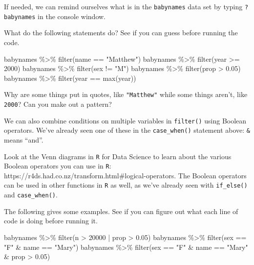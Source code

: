 \documentclass[
]{book}
\newenvironment{Shaded}{\begin{snugshade}}{\end{snugshade}}
\newcommand{\DecValTok}[1]{\textcolor[rgb]{0.00,0.00,0.81}{#1}}
\newcommand{\FloatTok}[1]{\textcolor[rgb]{0.00,0.00,0.81}{#1}}
\newcommand{\FunctionTok}[1]{\textcolor[rgb]{0.00,0.00,0.00}{#1}}
\newcommand{\NormalTok}[1]{#1}
\newcommand{\SpecialCharTok}[1]{\textcolor[rgb]{0.00,0.00,0.00}{#1}}
\newcommand{\StringTok}[1]{\textcolor[rgb]{0.31,0.60,0.02}{#1}}
\begin{document}
If needed, we can remind ourselves what is in the \texttt{babynames} data set by typing \texttt{?babynames} in the console window.

What do the following statements do? See if you can guess before running the code.

\begin{Shaded}
\begin{Highlighting}[]
\NormalTok{babynames }\SpecialCharTok{\%\textgreater{}\%} \FunctionTok{filter}\NormalTok{(name }\SpecialCharTok{==} \StringTok{"Matthew"}\NormalTok{)}
\NormalTok{babynames }\SpecialCharTok{\%\textgreater{}\%} \FunctionTok{filter}\NormalTok{(year }\SpecialCharTok{\textgreater{}=} \DecValTok{2000}\NormalTok{)}
\NormalTok{babynames }\SpecialCharTok{\%\textgreater{}\%} \FunctionTok{filter}\NormalTok{(sex }\SpecialCharTok{!=} \StringTok{"M"}\NormalTok{)}
\NormalTok{babynames }\SpecialCharTok{\%\textgreater{}\%} \FunctionTok{filter}\NormalTok{(prop }\SpecialCharTok{\textgreater{}} \FloatTok{0.05}\NormalTok{)}
\NormalTok{babynames }\SpecialCharTok{\%\textgreater{}\%} \FunctionTok{filter}\NormalTok{(year }\SpecialCharTok{==} \FunctionTok{max}\NormalTok{(year))}
\end{Highlighting}
\end{Shaded}

Why are some things put in quotes, like \texttt{"Matthew"} while some things aren't, like \texttt{2000}? Can you make out a pattern?

We can also combine conditions on multiple variables in \texttt{filter()} using Boolean operators. We've already seen one of these in the \texttt{case\_when()} statement above: \texttt{\&} means ``and''.

Look at the Venn diagrams in \texttt{R} for Data Science to learn about the various Boolean operators you can use in \texttt{R}: https://r4ds.had.co.nz/transform.html\#logical-operators. The Boolean operators can be used in other functions in \texttt{R} as well, as we've already seen with \texttt{if\_else()} and \texttt{case\_when()}.

The following gives some examples. See if you can figure out what each line of code is doing before running it.

\begin{Shaded}
\begin{Highlighting}[]
\NormalTok{babynames }\SpecialCharTok{\%\textgreater{}\%} \FunctionTok{filter}\NormalTok{(n }\SpecialCharTok{\textgreater{}} \DecValTok{20000} \SpecialCharTok{|}\NormalTok{ prop }\SpecialCharTok{\textgreater{}} \FloatTok{0.05}\NormalTok{)}
\NormalTok{babynames }\SpecialCharTok{\%\textgreater{}\%} \FunctionTok{filter}\NormalTok{(sex }\SpecialCharTok{==} \StringTok{"F"} \SpecialCharTok{\&}\NormalTok{ name }\SpecialCharTok{==} \StringTok{"Mary"}\NormalTok{)}
\NormalTok{babynames }\SpecialCharTok{\%\textgreater{}\%} \FunctionTok{filter}\NormalTok{(sex }\SpecialCharTok{==} \StringTok{"F"} \SpecialCharTok{\&}\NormalTok{ name }\SpecialCharTok{==} \StringTok{"Mary"} \SpecialCharTok{\&}\NormalTok{ prop }\SpecialCharTok{\textgreater{}} \FloatTok{0.05}\NormalTok{)}
\end{Highlighting}
\end{Shaded}
\end{document}
